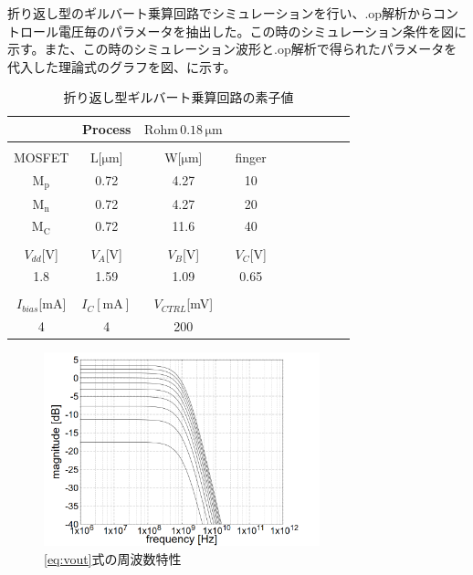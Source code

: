 \documentclass[twocolumn]{jsarticle}
\begin{document}
    折り返し型のギルバート乗算回路でシミュレーションを行い、.op解析からコントロール電圧毎のパラメータを抽出した。この時のシミュレーション条件を図に示す。また、この時のシミュレーション波形と.op解析で得られたパラメータを代入した理論式のグラフを図、に示す。
    \begin{table}[h]
        \caption{折り返し型ギルバート乗算回路の素子値}
        \label{table:state_folded_ac}
        \centering
        \begin{tabular}{cccccccccc}
            \hline
            &Process&$\mathrm{Rohm\,0.18\,\mu m}$&\\
            \hline
            &&&\\
            MOSFET & L[$\mathrm{\mu m}$] & W[$\mathrm{\mu m}$] & finger\\
            \hline \hline
            $\mathrm{M_{p}}$ & 0.72 & 4.27 & 10 \\
            $\mathrm{M_{n}}$ & 0.72 & 4.27 & 20 \\
            $\mathrm{M_{C}}$ & 0.72 & 11.6 & 40 \\
            &&&\\
            $V_{dd}$[V] & $V_{A}$[V] & $V_{B}$[V] & $V_{C}$[V]\\
            \hline\hline
            1.8 & 1.59 & 1.09 & 0.65 \\
            &&&\\
            $I_{bias}$[mA] & $I_{C}\mathrm{[mA]}$ & $V_{CTRL}$[mV] & \\
            \hline\hline
            4 & 4 & 200 & \\
        \end{tabular}
    \end{table}
    \begin{figure}[H]
        \begin{center}
            \includegraphics*[width = 80mm]{figures/vout_ac_theoretical_monochrome.PNG}
            \caption{\eqref{eq:vout}式の周波数特性}
            \label{fig:vout_theoretical}
        \end{center}
    \end{figure}
\end{document}
